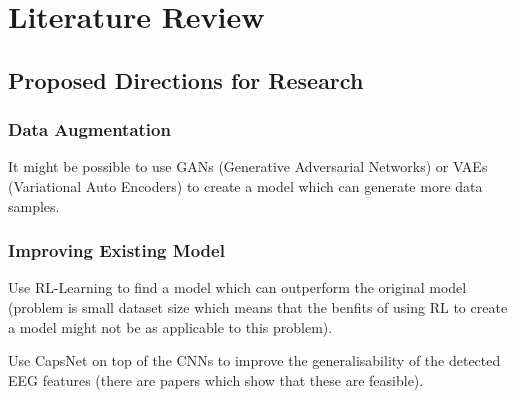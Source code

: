 \chapter{Literature Review} \label{chap:lit-review}

\section{Proposed Directions for Research}

\subsection{Data Augmentation}

It might be possible to use GANs (Generative Adversarial Networks) or
VAEs (Variational Auto Encoders) to create a model which can generate
more data samples.

\subsection{Improving Existing Model}

Use RL-Learning to find a model which can outperform the original model
(problem is small dataset size which means that the benfits of using RL
to create a model might not be as applicable to this problem).

Use CapsNet on top of the CNNs to improve the generalisability of the
detected EEG features (there are papers which show that these are
feasible).